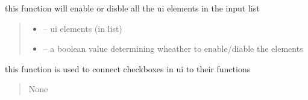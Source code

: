\documentclass[letterpaper,10pt,english]{sphinxmanual}
\begin{document}
\begin{savenotes}
\begin{fulllineitems}
\begin{savenotes}\begin{fulllineitems}
\label{\detokenize{setting/setting_UI:oxin.setting_UI.UI_main_window.set_button_enable_or_disable}}
\pysigstartsignatures
{}
\pysigstopsignatures
\sphinxAtStartPar
this function will enable or disble all the ui elements in the input list
\begin{quote}\begin{description}
\begin{itemize}
\item {} 
\sphinxAtStartPar
{} – ui elements (in list)

\item {} 
\sphinxAtStartPar
{} – a boolean value determining wheather to enable/diable the elements

\end{itemize}

\end{description}\end{quote}

\end{fulllineitems}\end{savenotes}


\begin{savenotes}\begin{fulllineitems}
\label{\detokenize{setting/setting_UI:oxin.setting_UI.UI_main_window.set_checkboxes}}
\pysigstartsignatures
{}
\pysigstopsignatures
\sphinxAtStartPar
this function is used to connect checkboxes in ui to their functions
\begin{quote}\begin{description}
\sphinxAtStartPar
None

\end{description}\end{quote}

\end{fulllineitems}\end{savenotes}


\end{fulllineitems}
\end{savenotes}
\end{document}
